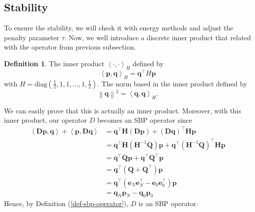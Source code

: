 \documentclass{article}
\theoremstyle{definition}
\newtheorem{definition}{Definition}[section]
\begin{document}
    \subsection{Stability}
    To ensure the stability, we will check it with energy methods and adjust 
    the penalty parameter $\tau$. 
    Now, we well introduce a discrete inner product that related with the operator from
    previous subsection. 
    \begin{definition}
        The inner product $\left<\cdot,\cdot\right>_H$ defined by
        \[
            \left\langle \mathbf{p},\mathbf{q}\right\rangle_H = \mathbf{q}^\top H\mathbf{p}
        \]
        with $H=\text{diag}(\frac12,1,1,\dots,1,\frac12)$. The norm based
        in the inner product defined by 
        \[
            \left\| \mathbf{q} \right\|^2 = \left\langle \mathbf{q},\mathbf{q}\right\rangle_H. 
        \]
    \end{definition}
    We can easily prove that this is actually an inner product. Moreover, with this 
    inner product, our operator $D$ becomes an SBP operator since 
    \begin{align}
        \left\langle \mathbf{D}\mathbf{p},\mathbf{q}\right\rangle 
        + \left\langle \mathbf{p},\mathbf{D}\mathbf{q}\right\rangle 
        &= \mathbf{q}^\top \mathbf{H}(\mathbf{D}\mathbf{p}) + (\mathbf{D}\mathbf{q})^\top \mathbf{H}\mathbf{p} \\
        &= \mathbf{q}^\top \mathbf{H}(\mathbf{H}^{-1}\mathbf{Q})\mathbf{p} + \mathbf{q}^\top (\mathbf{H}^{-1}\mathbf{Q})^\top \mathbf{H}\mathbf{p}\\
        &= \mathbf{q}^\top \mathbf{Q}\mathbf{p} + \mathbf{q}^\top \mathbf{Q}^\top \mathbf{p} \\
        &= \mathbf{q}^\top (\mathbf{Q}+\mathbf{Q}^\top )\mathbf{p} \\
        &= \mathbf{q}^\top (\mathbf{e}_N\mathbf{e}_N^\top  - \mathbf{e}_0\mathbf{e}_0^\top )\mathbf{p}\\
        &= \mathbf{q}_N \mathbf{p}_N  - \mathbf{q}_0 \mathbf{p}_0  
    \end{align}
    Hence, by Definition (\ref{def-sbp-operator}), $D$ is an SBP operator. 
    
\end{document}
